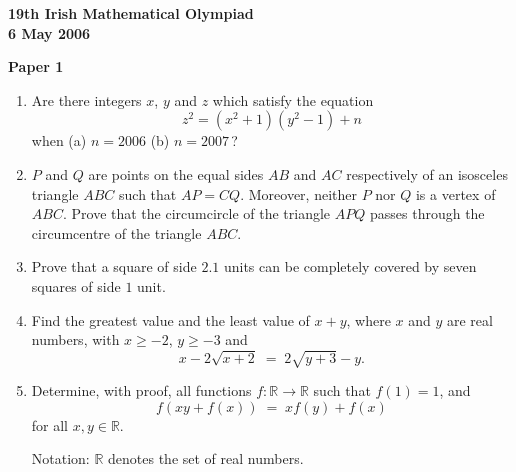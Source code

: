 \documentclass[12pt]{article}
\begin{document}
\begin{center}
{\large\bfseries 19th Irish Mathematical Olympiad\\6 May 2006}
\end{center}
\bigskip\noindent\textbf{Paper 1}\bigskip
\begin{enumerate}
\item Are there integers $x$, $y$ and $z$ which satisfy the equation
\[
z^2 = (x^2+1)(y^2-1)+n
\]
when (a) $n = 2006$ \quad (b) $n = 2007$\,?

\item $P$ and $Q$ are points on the equal sides $AB$ and $AC$ respectively of an isosceles triangle $ABC$ such that $AP = CQ$. Moreover, neither $P$ nor $Q$ is a vertex of $ABC$. Prove that the circumcircle of the triangle $APQ$ passes through the circumcentre of the triangle $ABC$.

\item Prove that a square of side $2.1$ units can be completely covered by seven squares of side $1$ unit.

\item Find the greatest value and the least value of $x + y$, where $x$ and $y$ are real numbers, with $x \ge -2$, $y \ge -3$ and
\[
x - 2\sqrt{x+2} \;=\; 2\sqrt{y+3} - y.
\]

\item Determine, with proof, all functions $f : \mathbb{R} \to \mathbb{R}$ such that $f(1) = 1$, and
\[
f(xy + f(x)) \;=\; xf(y) + f(x)
\]
for all $x, y \in \mathbb{R}$.

Notation: $\mathbb{R}$ denotes the set of real numbers.
\end{enumerate}
\end{document}
